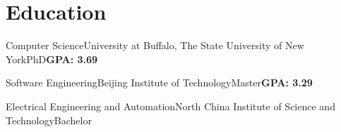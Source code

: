 

\section{Education}

{Computer Science}{University at Buffalo, The State University of New York}{PhD}{\textbf{GPA: 3.69}}
{
}

{Software Engineering}{Beijing Institute of Technology}{Master}{\textbf{GPA: 3.29}}
{
}

{Electrical Engineering and Automation}{North China Institute of Science and Technology}{Bachelor}{}
{
}
